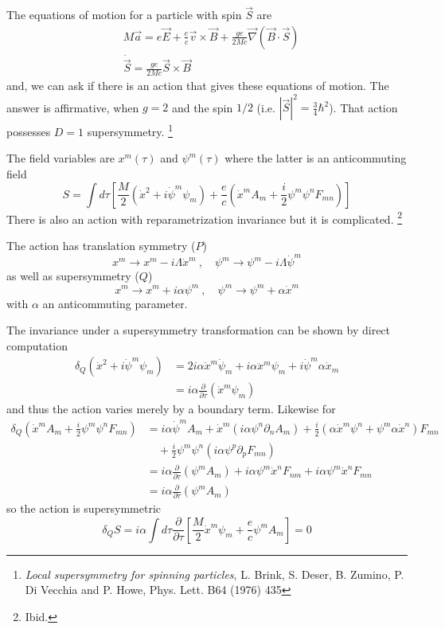 \documentclass[a4paper,12pt]{article}
\numberwithin{equation}{section}
\numberwithin{exe}{section}
\newcommand{\p}{{\partial}}
\newcommand{\xd}{{\dot x}}
\renewcommand{\a}{{\alpha}}
\renewcommand{\d}{{\delta}}
\renewcommand{\L}{{\Lambda}}
\begin{document}
The equations of motion for a particle with spin $\vec S$ are
	\begin{align}
	& M\vec a = e\vec E + \frac{e}{c}\vec v \times \vec B + \frac{ge}{2Mc}\vec\nabla(\vec B\cdot \vec S) \\
	& \dot{\vec S} = \frac{ge}{2Mc} \vec S \times \vec B
	\end{align}
and, we can ask if there is an action that gives these equations of motion. The answer is affirmative, when $g=2$ and the spin $1/2$ (i.e. $|\vec S|^2 = \frac34 \hbar^2$). That action possesses $D=1$ supersymmetry.%
\footnote{ {\it Local supersymmetry for spinning particles}, L. Brink, S. Deser, B. Zumino, P. Di Vecchia and P. Howe, Phys. Lett. B64 (1976) 435}

The field variables are $x^m(\tau)$ and $\psi^m(\tau)$ where the latter is an anticommuting field
	\begin{equation}
	S = \int d\tau \left[ \frac{M}{2}(\xd^2 + i\dot\psi^m\psi_m) + \frac{e}{c}(\xd^m A_m + \frac{i}{2} \psi^m\psi^n F_{mn}) \right]
	\end{equation}
There is also an action with reparametrization invariance but it is complicated.%
\footnote{Ibid.}

The action has translation symmetry ($P$)
	\begin{equation}
	\label{transl}
	x^m\rightarrow x^m - i\L \xd^m\ ,\quad \psi^m \rightarrow \psi^m - i\L \dot\psi^m
	\end{equation}
as well as supersymmetry ($Q$)
	\begin{equation}
	x^m \rightarrow x^m + i\a \psi^m\ ,\quad \psi^m \rightarrow \psi^m + \a \xd^m
	\end{equation}
with $\a$ an anticommuting parameter.

The invariance under a supersymmetry transformation can be shown by direct computation
	\begin{align}
	\d_Q(\xd^2 + i\dot\psi^m \psi_m ) & = 2i\a \xd^m \dot\psi_m + i\a\ddot x^m \psi_m + i\dot\psi^m \a \xd_m \nonumber \\
	& = i\a \frac{\p}{\p\tau}(\xd^m \psi_m)
	\end{align}
and thus the action varies merely by a boundary term. Likewise for
	\begin{align}
	\d_Q (\xd^m A_m + \frac{i}{2} \psi^m\psi^n F_{mn}) & = i\a \dot\psi^m A_m + \xd^m (i\a\psi^n \p_n A_m) + \frac{i}{2}(\a\xd^m \psi^n +\psi^m\a\xd^n)F_{mn} \nonumber \\
	& \quad  +\frac{i}{2}\psi^m\psi^n (i\a\psi^p \p_p F_{mn}) \nonumber \\
	& = i\a \frac{\p}{\p\tau}(\psi^m A_m) + i\a\psi^m\xd^n F_{nm} +i\a\psi^m\xd^n F_{mn} \nonumber \\
	& = i\a \frac{\p}{\p\tau}(\psi^m A_m)
	\end{align}
so the action is supersymmetric
	\begin{equation}
	\d_Q S = i\a \int d\tau \frac{\p}{\p\tau}\left[ \frac{M}{2} \xd^m\psi_m +\frac{e}{c}\psi^m A_m \right] = 0
	\end{equation}
\end{document}
